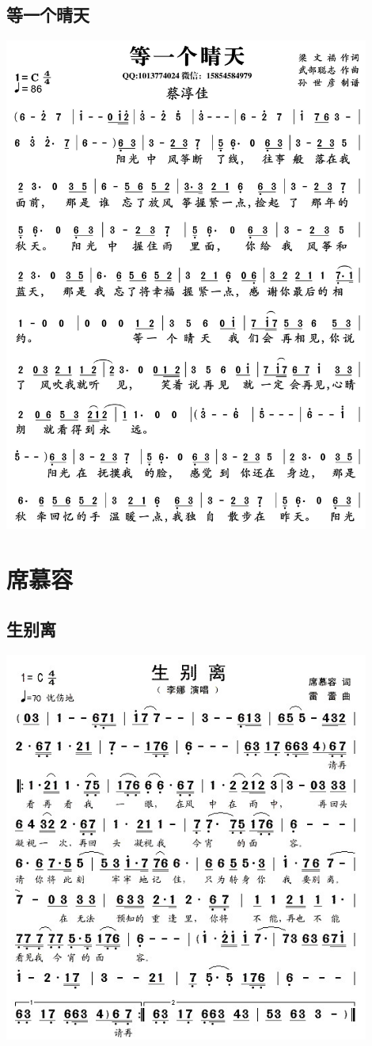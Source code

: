 \documentclass[cn,pad,twocol]{elegantbook}
\begin{document}
\section{等一个晴天} \includegraphics[width=0.9\textwidth]{macos/2020武部聪志-等一个夏天.jpg}

\chapter{席慕容}
\section{生别离}\includegraphics[width=0.9\textwidth]{rpi400/20210209生别离.jpg}
\end{document}
